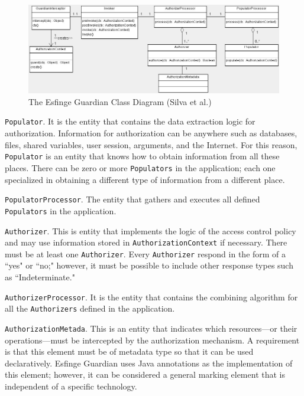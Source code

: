\documentclass[sigconf]{acmart}
\begin{document}
\begin{figure}
 \centering
 \includegraphics[scale=1.7]{guardian-class-diagram.jpg}
 \caption{The Esfinge Guardian Class Diagram (Silva et al.\cite{Silva2013})}
 \label{fig:class-diagram}
\end{figure}

\noindent \verb|Populator|.
It is the entity that contains the data extraction logic for authorization. Information for authorization can be anywhere such as databases, files, shared variables, user session, arguments, and the Internet. For this reason, \verb|Populator| is an entity that knows how to obtain information from all these places.
There can be zero or more \verb|Populators| in the application; each one specialized in obtaining a different type of information from a different place.

\noindent \verb|PopulatorProcessor|.
The entity that gathers and executes all defined \verb|Populators| in the application.

\noindent \verb|Authorizer|. This is entity that implements the logic of the access control policy and may use information stored in \verb|AuthorizationContext| if necessary. There must be at least one \verb|Authorizer|. Every \verb|Authorizer| respond in the form of a ``yes" or ``no;" however, it must be possible to include other response types such as ``Indeterminate."

\noindent \verb|AuthorizerProcessor|.
It is the entity that contains the combining algorithm for all the \verb|Authorizers| defined in the application.

\noindent \verb|AuthorizationMetada|.
This is an entity that indicates which resources---or their operations---must be intercepted by the authorization mechanism. A requirement is that this element must be of metadata type so that it can be used declaratively. Esfinge Guardian uses Java annotations as the implementation of this element; however, it can be considered a general marking element that is independent of a specific technology.
\end{document}
